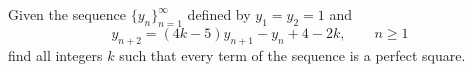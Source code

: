 Given the sequence $\{y_n\}_{n=1}^{\infty}$ defined by $y_1=y_2=1$ and
\[y_{n+2} = (4k-5)y_{n+1}-y_n+4-2k, \qquad n\ge1\]
find all integers $k$ such that every term of the sequence is a perfect square.
